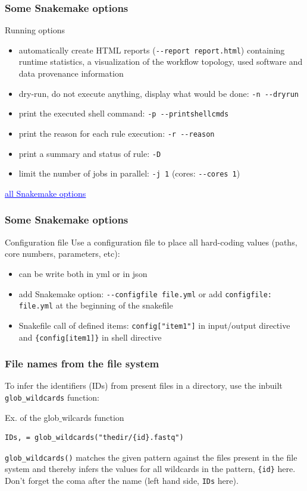 \begin{frame}[containsverbatim]
\frametitle{Some Snakemake options}
\begin{block}{Running options}
\begin{itemize}
    \item automatically create HTML reports (\verb|--report report.html|) containing runtime statistics, a visualization of the workflow topology, used software and data provenance information
    \item dry-run, do not execute anything, display what would be done: \verb|-n --dryrun|
    \item print the executed shell command: \verb|-p --printshellcmds |
    \item print the reason for each rule execution: \verb|-r --reason|
    \item print a summary and status of rule: \verb|-D|
    \item limit the number of jobs in parallel: \verb|-j 1| (cores: \verb|--cores 1|)
\end{itemize}
\end{block}
\vfill
\href{https://snakemake.readthedocs.io/en/stable/executing/cli.html#all-option}{\textcolor{blue}{\underline{all Snakemake options}}}
\end{frame}
\begin{frame}[containsverbatim]
\frametitle{Some Snakemake options}
\begin{block}{Configuration file}
Use a configuration file to place all hard-coding values (paths, core numbers, parameters, etc):
\begin{itemize}
    \item can be write both in yml or in json
    \item add Snakemake option: \verb|--configfile file.yml| or add \verb|configfile: file.yml| at the beginning of the snakefile
    \item Snakefile call of defined items: \verb|config["item1"]| in input/output directive and \verb|{config[item1]}| in shell directive
\end{itemize}
\end{block}
\end{frame}
\begin{frame}[containsverbatim]
\frametitle{File names from the file system}
To infer the identifiers (IDs) from present files in a directory, use the inbuilt \verb|glob_wildcards| function:
\begin{block}{Ex. of the glob$\_$wilcards function}
\begin{lstlisting}
IDs, = glob_wildcards("thedir/{id}.fastq")
\end{lstlisting}
\end{block}
\verb|glob_wildcards()| matches the given pattern against the files present in the file system and thereby infers the values for all wildcards in the pattern, \verb|{id}| here. 
\vfill
Don't forget the coma after the name (left hand side, \verb|IDs| here).
\end{frame}
